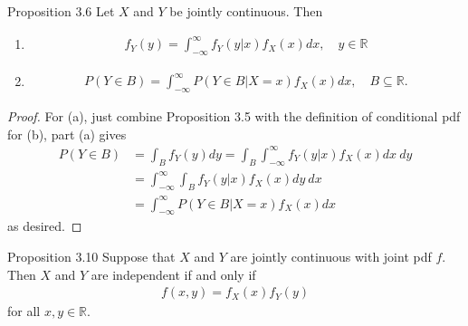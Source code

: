 \begin{boks}{Proposition 3.6}
Let $X$ and $Y$ be jointly continuous. Then
\begin{enumerate}
    \item
    \begin{align*}
        f_Y(y) = \int_{-\infty}^\infty f_Y(y|x)f_X(x)dx, \quad y\in\mathbb{R}
    \end{align*}
    \item
    \begin{align*}
        P(Y \in B) = \int_{-\infty}^\infty P(Y \in B|X = x)f_X(x)dx, \quad B\subseteq\mathbb{R}.
    \end{align*}
\end{enumerate}
\end{boks}

\begin{proof}
For (a), just combine Proposition 3.5 with the definition of conditional pdf for (b), part (a) gives
\begin{align*}
    P(Y \in B) &= \int_B f_Y(y)dy = \int_B \int_{-\infty}^\infty f_Y(y|x)f_X(x)dx \ dy \\
    &= \int_{-\infty}^\infty \int_B f_Y(y|x)f_X(x)dy \ dx \\
    &= \int_{-\infty}^\infty P(Y \in B|X = x) f_X(x)dx
\end{align*}
as desired.
\end{proof}

\begin{boks}{Proposition 3.10}
Suppose that $X$ and $Y$ are jointly continuous with joint pdf $f$. Then $X$ and $Y$ are independent if and only if
\begin{align*}
    f(x, y) = f_X(x)f_Y(y)
\end{align*}
for all $x,y \in \mathbb{R}$.
\end{boks}

%
